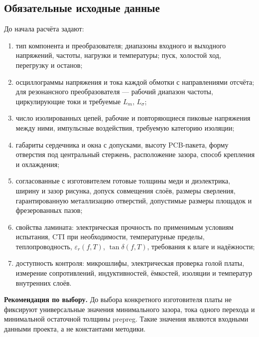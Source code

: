 \documentclass[14pt,a4paper]{extarticle}
\newcommand{\recommend}{\par\noindent\textbf{Рекомендация по выбору.} }
\begin{document}
\subsection{Обязательные исходные данные}
До начала расчёта задают:
\begin{enumerate}
\item тип компонента и преобразователя; диапазоны входного и выходного напряжений, частоты, нагрузки и температуры; пуск, холостой ход, перегрузку и останов;
\item осциллограммы напряжения и тока каждой обмотки с направлениями отсчёта; для резонансного преобразователя --- рабочий диапазон частоты, циркулирующие токи и требуемые $L_m$, $L_\sigma$;
\item число изолированных цепей, рабочие и повторяющиеся пиковые напряжения между ними, импульсные воздействия, требуемую категорию изоляции;
\item габариты сердечника и окна с допусками, высоту PCB-пакета, форму отверстия под центральный стержень, расположение зазора, способ крепления и охлаждения;
\item согласованные с изготовителем готовые толщины меди и диэлектрика, ширину и зазор рисунка, допуск совмещения слоёв, размеры сверления, гарантированную металлизацию отверстий, допустимые размеры площадок и фрезерованных пазов;
\item свойства ламината: электрическая прочность по применимым условиям испытания, CTI при необходимости, температурные пределы, теплопроводность, $\varepsilon_r(f,T)$, $\tan\delta(f,T)$, требования к влаге и надёжности;
\item доступность контроля: микрошлифы, электрическая проверка голой платы, измерение сопротивлений, индуктивностей, ёмкостей, изоляции и температур внутренних слоёв.
\end{enumerate}
\recommend До выбора конкретного изготовителя платы не фиксируют универсальные значения минимального зазора, тока одного перехода и минимальной остаточной толщины prepreg. Такие значения являются входными данными проекта, а не константами методики.
\end{document}
